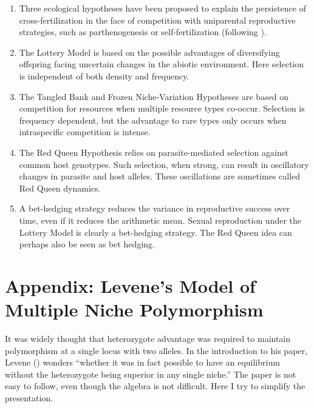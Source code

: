 \documentclass[
  letterpaper,
]{book}
\providecommand{\tightlist}{%
  \setlength{\itemsep}{0pt}\setlength{\parskip}{0pt}}\usepackage{longtable,booktabs,array}
\begin{document}
\begin{enumerate}
\def\labelenumi{\arabic{enumi}.}
\tightlist
\item
  Three ecological hypotheses have been proposed to explain the
  persistence of cross-fertilization in the face of competition with
  uniparental reproductive strategies, such as parthenogenesis or
  self-fertilization (following ).
\item
  The Lottery Model is based on the possible advantages of diversifying
  offspring facing uncertain changes in the abiotic environment. Here
  selection is independent of both density and frequency.
\item
  The Tangled Bank and Frozen Niche-Variation Hypotheses are based on
  competition for resources when multiple resource types co-occur.
  Selection is frequency dependent, but the advantage to rare types only
  occurs when intraspecific competition is intense.
\item
  The Red Queen Hypothesis relies on parasite-mediated selection against
  common host genotypes. Such selection, when strong, can result in
  oscillatory changes in parasite and host alleles. These oscillations
  are sometimes called Red Queen dynamics.
\item
  A bet-hedging strategy reduces the variance in reproductive success
  over time, even if it reduces the arithmetic mean. Sexual reproduction
  under the Lottery Model is clearly a bet-hedging strategy. The Red
  Queen idea can perhaps also be seen as bet hedging.
\end{enumerate}

\section{Appendix: Levene's Model of Multiple Niche
Polymorphism}\label{sec-app-2}

It was widely thought that heterozygote advantage was required to
maintain polymorphism at a single locus with two alleles. In the
introduction to his paper, Levene ()
wonders ``whether it was in fact possible to have an equilibrium without
the heterozygote being superior in any single niche.'' The paper is not
easy to follow, even though the algebra is not difficult. Here I try to
simplify the presentation.
\end{document}
